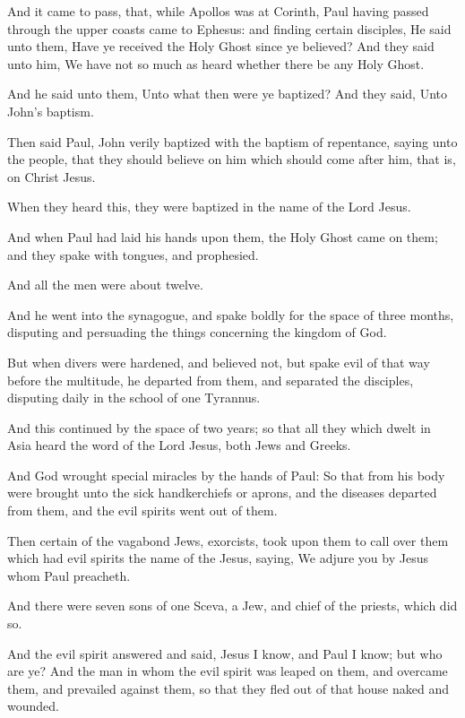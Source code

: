 \Chapter
\Verse And it came to pass, that, while Apollos was at Corinth, Paul having passed through the upper coasts came to Ephesus: and finding certain disciples, \Verse He said unto them, Have ye received the Holy Ghost since ye believed?  And they said unto him, We have not so much as heard whether there be any Holy Ghost.

\Verse And he said unto them, Unto what then were ye baptized? And they said, Unto John's baptism.

\Verse Then said Paul, John verily baptized with the baptism of repentance, saying unto the people, that they should believe on him which should come after him, that is, on Christ Jesus.

\Verse When they heard this, they were baptized in the name of the Lord Jesus.

\Verse And when Paul had laid his hands upon them, the Holy Ghost came on them; and they spake with tongues, and prophesied.

\Verse And all the men were about twelve.

\Verse And he went into the synagogue, and spake boldly for the space of three months, disputing and persuading the things concerning the kingdom of God.

\Verse But when divers were hardened, and believed not, but spake evil of that way before the multitude, he departed from them, and separated the disciples, disputing daily in the school of one Tyrannus.

\Verse And this continued by the space of two years; so that all they which dwelt in Asia heard the word of the Lord Jesus, both Jews and Greeks.

\Verse And God wrought special miracles by the hands of Paul: \Verse So that from his body were brought unto the sick handkerchiefs or aprons, and the diseases departed from them, and the evil spirits went out of them.

\Verse Then certain of the vagabond Jews, exorcists, took upon them to call over them which had evil spirits the name of the \LORD Jesus, saying, We adjure you by Jesus whom Paul preacheth.

\Verse And there were seven sons of one Sceva, a Jew, and chief of the priests, which did so.

\Verse And the evil spirit answered and said, Jesus I know, and Paul I know; but who are ye?  \Verse And the man in whom the evil spirit was leaped on them, and overcame them, and prevailed against them, so that they fled out of that house naked and wounded.

